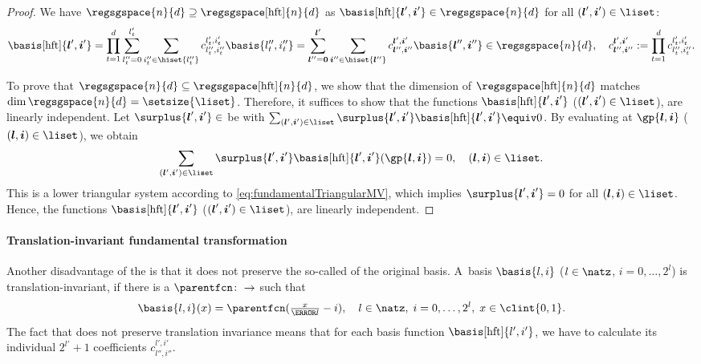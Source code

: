 \begin{proof}
  We have $\regsgspace{n}{d} \supset \regsgspace[\hft]{n}{d}$ as
  $\basis[\hft]{\*l',\*i'} \in \regsgspace{n}{d}$
  for all $(\*l', \*i') \in \liset$:
  \begin{equation}
    \basis[\hft]{\*l',\*i'}
    = \prod_{t=1}^d \sum_{l''_t=0}^{l'_t} \sum_{i''_t \in \hiset{l''_t}}
    c_{l''_t,i''_t}^{l'_t,i'_t} \basis{l''_t,i''_t}
    = \sum_{\*l''=\*0}^{\*l'} \sum_{\*i'' \in \hiset{\*l''}}
    c_{\*l'',\*i''}^{\*l',\*i'} \basis{\*l'',\*i''}
    \in \regsgspace{n}{d},\quad
    c_{\*l'',\*i''}^{\*l',\*i'}
    := \prod_{t=1}^d c_{l''_t,i''_t}^{l'_t,i'_t}.
  \end{equation}
  
  To prove that $\regsgspace{n}{d} \subset \regsgspace[\hft]{n}{d}$,
  we show that the dimension of $\regsgspace[\hft]{n}{d}$
  matches $\dim \regsgspace{n}{d} = \setsize{\liset}$.
  Therefore, it suffices to show that
  the functions $\basis[\hft]{\*l',\*i'}$ ($(\*l', \*i') \in \liset$),
  are linearly independent.
  Let $\surplus{\*l',\*i'} \in \real$ be with
  $\sum_{(\*l', \*i') \in \liset}
  \surplus{\*l',\*i'} \basis[\hft]{\*l',\*i'} \equiv 0$.
  By evaluating at $\gp{\*l,\*i}$ ($(\*l, \*i) \in \liset$), we obtain
  \begin{equation}
    \sum_{(\*l', \*i') \in \liset}
    \surplus{\*l',\*i'} \basis[\hft]{\*l',\*i'}(\gp{\*l,\*i}) = 0,\quad
    (\*l, \*i) \in \liset.
  \end{equation}
  This is a lower triangular system according to
  \eqref{eq:fundamentalTriangularMV},
  which implies $\surplus{\*l',\*i'} = 0$ for all $(\*l, \*i) \in \liset$.
  Hence, the functions $\basis[\hft]{\*l',\*i'}$ ($(\*l', \*i') \in \liset$),
  are linearly independent.
\end{proof}

\paragraph{Translation-invariant fundamental transformation}

Another disadvantage of the \hftr is that it does not preserve
the so-called  of the original basis.
A~basis $\basis{l,i}$ ($l \in \natz$, $i = 0, \dotsc, 2^l$)
is translation-invariant, if there is a 
$\parentfcn\colon \real \to \real$
such that
\begin{equation}
  \label{eq:translationInvariance}
  \basis{l,i}(x)
  = \parentfcn(\tfrac{x}{\ms{l}} - i),\quad
  l \in \natz,\;
  i = 0, \dotsc, 2^l,\;
  x \in \clint{0, 1}.
\end{equation}
The fact that \hftr does not preserve translation invariance means
that for each basis function $\basis[\hft]{l',i'}$, we have to
calculate its individual $2^{l'} + 1$ coefficients $c_{l'',i''}^{l',i'}$.

